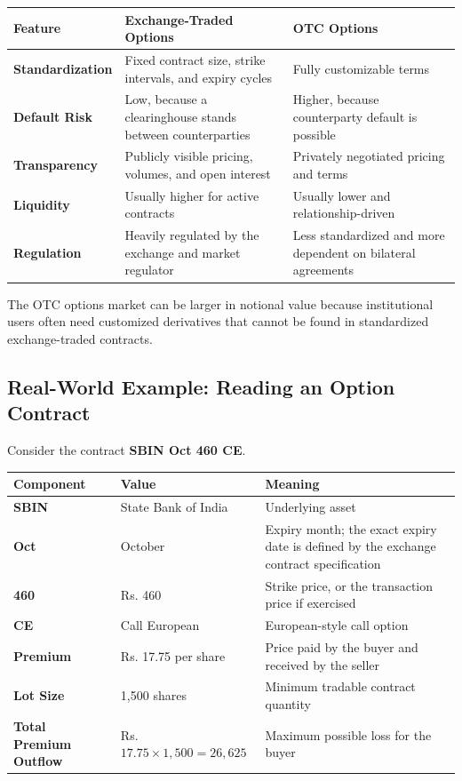 \documentclass[12pt,openany]{book}
\begin{document}
\begin{center}
\small
\begin{tabular}{|L{3.2cm}|L{5.5cm}|L{5.5cm}|}
\hline
\textbf{Feature} & \textbf{Exchange-Traded Options} & \textbf{OTC Options} \\
\hline
\textbf{Standardization} & Fixed contract size, strike intervals, and expiry cycles & Fully customizable terms \\
\hline
\textbf{Default Risk} & Low, because a clearinghouse stands between counterparties & Higher, because counterparty default is possible \\
\hline
\textbf{Transparency} & Publicly visible pricing, volumes, and open interest & Privately negotiated pricing and terms \\
\hline
\textbf{Liquidity} & Usually higher for active contracts & Usually lower and relationship-driven \\
\hline
\textbf{Regulation} & Heavily regulated by the exchange and market regulator & Less standardized and more dependent on bilateral agreements \\
\hline
\end{tabular}
\end{center}

The OTC options market can be larger in notional value because institutional users often need customized derivatives that cannot be found in standardized exchange-traded contracts.

\subsection{Real-World Example: Reading an Option Contract}

Consider the contract \textbf{SBIN Oct 460 CE}.

\begin{center}
\small
\begin{tabular}{|L{4cm}|L{4cm}|L{6cm}|}
\hline
\textbf{Component} & \textbf{Value} & \textbf{Meaning} \\
\hline
\textbf{SBIN} & State Bank of India & Underlying asset \\
\hline
\textbf{Oct} & October & Expiry month; the exact expiry date is defined by the exchange contract specification \\
\hline
\textbf{460} & Rs. 460 & Strike price, or the transaction price if exercised \\
\hline
\textbf{CE} & Call European & European-style call option \\
\hline
\textbf{Premium} & Rs. 17.75 per share & Price paid by the buyer and received by the seller \\
\hline
\textbf{Lot Size} & 1,500 shares & Minimum tradable contract quantity \\
\hline
\textbf{Total Premium Outflow} & Rs. \(17.75 \times 1{,}500 = 26{,}625\) & Maximum possible loss for the buyer \\
\hline
\end{tabular}
\end{center}
\end{document}
